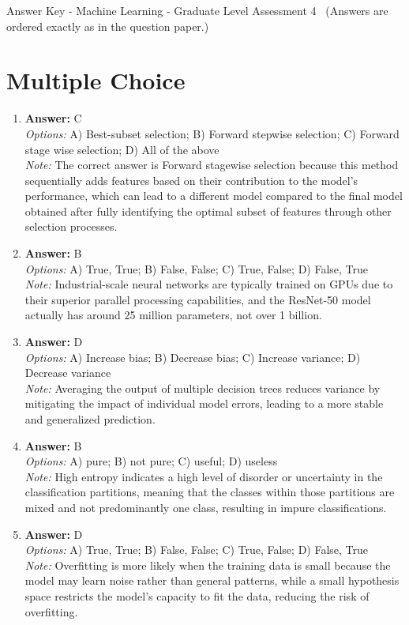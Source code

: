 \documentclass[12pt]{article}
\begin{document}
\begin{center}
Answer Key - Machine Learning - Graduate Level Assessment 4 \
\small (Answers are ordered exactly as in the question paper.)
\end{center}

\section*{Multiple Choice}
\begin{enumerate}[label=\arabic*.]
\item \textbf{Answer:} C
\\ \textit{Options:} A) Best-subset selection; B) Forward stepwise selection; C) Forward stage wise selection; D) All of the above
\\ \textit{Note:} The correct answer is Forward stagewise selection because this method sequentially adds features based on their contribution to the model's performance, which can lead to a different model compared to the final model obtained after fully identifying the optimal subset of features through other selection processes.
\item \textbf{Answer:} B
\\ \textit{Options:} A) True, True; B) False, False; C) True, False; D) False, True
\\ \textit{Note:} Industrial-scale neural networks are typically trained on GPUs due to their superior parallel processing capabilities, and the ResNet-50 model actually has around 25 million parameters, not over 1 billion.
\item \textbf{Answer:} D
\\ \textit{Options:} A) Increase bias; B) Decrease bias; C) Increase variance; D) Decrease variance
\\ \textit{Note:} Averaging the output of multiple decision trees reduces variance by mitigating the impact of individual model errors, leading to a more stable and generalized prediction.
\item \textbf{Answer:} B
\\ \textit{Options:} A) pure; B) not pure; C) useful; D) useless
\\ \textit{Note:} High entropy indicates a high level of disorder or uncertainty in the classification partitions, meaning that the classes within those partitions are mixed and not predominantly one class, resulting in impure classifications.
\item \textbf{Answer:} D
\\ \textit{Options:} A) True, True; B) False, False; C) True, False; D) False, True
\\ \textit{Note:} Overfitting is more likely when the training data is small because the model may learn noise rather than general patterns, while a small hypothesis space restricts the model's capacity to fit the data, reducing the risk of overfitting.
\end{enumerate}
\end{document}
